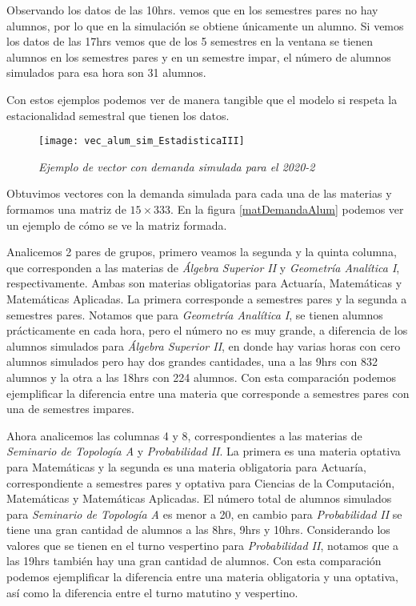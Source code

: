 Observando los datos de las 10hrs. vemos que en los semestres pares no hay alumnos, por lo que en la simulación se obtiene únicamente un alumno. Si vemos los datos de las 17hrs vemos que de los 5 semestres en la ventana se tienen alumnos en los semestres pares y en un semestre impar, el número de alumnos simulados para esa hora son 31 alumnos.

Con estos ejemplos podemos ver de manera tangible que el modelo si respeta la estacionalidad semestral que tienen los datos.

\begin{figure}[H]
\centering
\texttt{[image: vec\_alum\_sim\_EstadisticaIII]} %
\caption{\textit{Ejemplo de vector con demanda simulada para el 2020-2}}\label{vec_alum_sim}
\end{figure}

Obtuvimos vectores con la demanda simulada para cada una de las materias y formamos una matriz de $15 \times 333$. En la figura \ref{matDemandaAlum} podemos ver un ejemplo de cómo se ve la matriz formada.

Analicemos 2 pares de grupos, primero veamos la segunda y la quinta columna, que corresponden a las materias de \textit{Álgebra Superior II} y \textit{Geometría Analítica I}, respectivamente. Ambas son materias obligatorias para Actuaría, Matemáticas y Matemáticas Aplicadas. La primera corresponde a semestres pares y la segunda a semestres pares. Notamos que para \textit{Geometría Analítica I}, se tienen alumnos prácticamente en cada hora, pero el número no es muy grande, a diferencia de los alumnos simulados para \textit{Álgebra Superior II}, en donde hay varias horas con cero alumnos simulados pero hay dos grandes cantidades, una a las 9hrs con 832 alumnos y la otra a las 18hrs con 224 alumnos. Con esta comparación podemos ejemplificar la diferencia entre una materia que corresponde a semestres pares con una de semestres impares.

Ahora analicemos las columnas 4 y 8, correspondientes a las materias de \textit{Seminario de Topología A} y \textit{Probabilidad II}. La primera es una materia optativa para Matemáticas y la segunda es una materia obligatoria para Actuaría, correspondiente a semestres pares y optativa para Ciencias de la Computación, Matemáticas y Matemáticas Aplicadas. El número total de alumnos simulados para \textit{Seminario de Topología A} es menor a 20, en cambio para \textit{Probabilidad II} se tiene una gran cantidad de alumnos a las 8hrs, 9hrs y 10hrs. Considerando los valores que se tienen en el turno vespertino para \textit{Probabilidad II}, notamos que a las 19hrs también hay una gran cantidad de alumnos. Con esta comparación podemos ejemplificar la diferencia entre una materia obligatoria y una optativa, así como la diferencia entre el turno matutino y vespertino.


